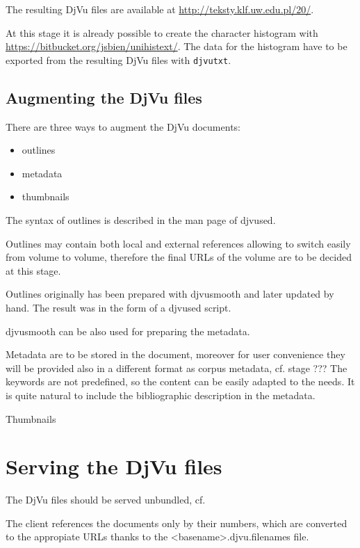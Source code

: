 \documentclass[runningheads,a4paper]{llncs}
\begin{document}
The resulting DjVu files are available at \url{http://teksty.klf.uw.edu.pl/20/}.

At this stage it is already possible to create the character histogram
with \url{https://bitbucket.org/jsbien/unihistext/}. The data for the
histogram have to be exported from the resulting DjVu files with
\texttt{djvutxt}.



\subsection{Augmenting the DjVu files}
\label{sec:augm-djvu-files}

There are three ways to augment the DjVu documents:
\begin{itemize}
\item outlines
\item metadata
\item thumbnails
\end{itemize}

The syntax of outlines is described in the man page of djvused.

Outlines may contain both local and external references allowing to
switch easily from volume to volume, therefore the final URLs of the
volume are to be decided at this stage. 

Outlines originally has been prepared with djvusmooth and later
updated by hand. The result was in the form of a djvused script.

djvusmooth can be also used for preparing the
metadata.

Metadata are to be stored in the document, moreover for user
convenience they will be provided also in a different format as corpus
metadata, cf. stage ??? The keywords are not predefined, so the
content can be easily adapted to the needs. It is quite natural to
include the bibliographic description in the metadata.

Thumbnails

\section{Serving the DjVu files}
\label{sec:serving-djvu-files}

The DjVu files should be served unbundled, cf. 

The client references the documents only by their numbers, which are
converted to the appropiate URLs thanks to the
<basename>.djvu.filenames file.
\end{document}
